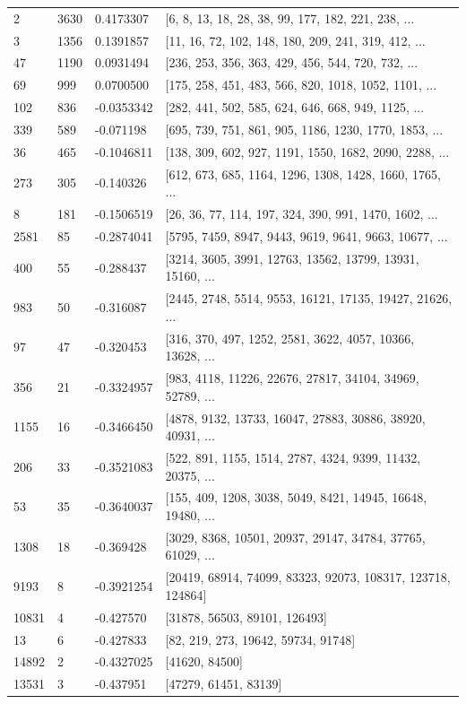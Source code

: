 \documentclass{article}
\theoremstyle{definition}
\theoremstyle{remark}
\numberwithin{equation}{section}
\begin{document}
{\begin{tabular}{llll}
2 & 3630 & 0.4173307 & [6, 8, 13, 18, 28, 38, 99, 177, 182, 221, 238, ...\\
3 & 1356 & 0.1391857 & [11, 16, 72, 102, 148, 180, 209, 241, 319, 412, ...\\
47 & 1190 & 0.0931494 & [236, 253, 356, 363, 429, 456, 544, 720, 732, ...\\
69 & 999 & 0.0700500 & [175, 258, 451, 483, 566, 820, 1018, 1052, 1101, ...\\
102 & 836 & -0.0353342 & [282, 441, 502, 585, 624, 646, 668, 949, 1125, ...\\
339 & 589 & -0.071198 & [695, 739, 751, 861, 905, 1186, 1230, 1770, 1853, ...\\
36 & 465 & -0.1046811 & [138, 309, 602, 927, 1191, 1550, 1682, 2090, 2288, ...\\
273 & 305 & -0.140326 & [612, 673, 685, 1164, 1296, 1308, 1428, 1660, 1765, ...\\
8 & 181 & -0.1506519 & [26, 36, 77, 114, 197, 324, 390, 991, 1470, 1602, ...\\
2581 & 85 & -0.2874041 & [5795, 7459, 8947, 9443, 9619, 9641, 9663, 10677, ...\\
400 & 55 & -0.288437 & [3214, 3605, 3991, 12763, 13562, 13799, 13931, 15160, ...\\
983 & 50 & -0.316087 & [2445, 2748, 5514, 9553, 16121, 17135, 19427, 21626, ...\\
97 & 47 & -0.320453 & [316, 370, 497, 1252, 2581, 3622, 4057, 10366, 13628, ...\\
356 & 21 & -0.3324957 & [983, 4118, 11226, 22676, 27817, 34104, 34969, 52789, ...\\
1155 & 16 & -0.3466450 & [4878, 9132, 13733, 16047, 27883, 30886, 38920, 40931, ...\\
206 & 33 & -0.3521083 & [522, 891, 1155, 1514, 2787, 4324, 9399, 11432, 20375, ...\\
53 & 35 & -0.3640037 & [155, 409, 1208, 3038, 5049, 8421, 14945, 16648, 19480, ...\\
1308 & 18 & -0.369428 & [3029, 8368, 10501, 20937, 29147, 34784, 37765, 61029, ...\\
9193 & 8 & -0.3921254 & [20419, 68914, 74099, 83323, 92073, 108317, 123718, 124864]\\
10831 & 4 & -0.427570 & [31878, 56503, 89101, 126493]\\
13 & 6 & -0.427833 & [82, 219, 273, 19642, 59734, 91748]\\
14892 & 2 & -0.4327025 & [41620, 84500]\\
13531 & 3 & -0.437951 & [47279, 61451, 83139]\\

\end{tabular}}
\end{document}
